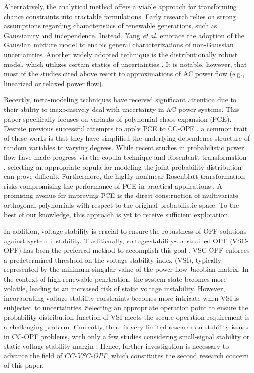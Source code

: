 \documentclass[journal]{IEEEtran}
\theoremstyle{definition}
\theoremstyle{remark}
\begin{document}
Alternatively, the analytical method offers a viable approach for transforming chance constraints into tractable formulations. Early research relies on strong assumptions regarding characteristics of renewable generations, such as Gaussianity and independence. Instead, Yang \textit{et al.} \cite{yang2020analytical} embrace the adoption of the Gaussian mixture model to enable general characterizations of non-Gaussian uncertainties. Another widely adopted technique is the distributionally robust model, which utilizes certain statics of uncertainties \cite{roald2018chance,li2019distribution,arab2022distributionally,arrigo2022embed}. It is notable, however, that most of the studies cited above resort to approximations of AC power flow (e.g., linearized or relaxed power flow).

Recently, meta-modeling techniques have received significant attention due to their ability to inexpensively deal with uncertainty in AC power systems. This paper specifically focuses on variants of polynomial chaos expansion (PCE). Despite previous successful attempts to apply PCE to CC-OPF \cite{li2018compressive,muhlpfordt2019chance,metivier2020efficient,xu2021iterative}, a common trait of these works is that they have simplified the underlying dependence structure of random variables to varying degrees.
While recent studies in probabilistic power flow have made progress via the copula technique and Rosenblatt transformation
 \cite{ye2022generalized,ly2022scalable}, selecting an appropriate copula for modeling the joint probability distribution can prove difficult. Furthermore, the highly nonlinear Rosenblatt transformation risks compromising the performance of PCE in practical applications \cite{lee2022reliability}. A promising avenue for improving PCE is the direct construction of multivariate orthogonal polynomials with respect to the original probabilistic space. To the best of our knowledge, this approach is yet to receive sufficient exploration.

 In addition, voltage stability is crucial to ensure the robustness of OPF solutions against system instability. Traditionally, voltage-stability-constrained OPF (VSC-OPF) has been the preferred method to accomplish this goal \cite{jia2023voltage,cui2018new,avalos2008practical}. VSC-OPF enforces a predetermined threshold on the voltage stability index (VSI), typically represented by the minimum singular value of the power flow Jacobian matrix. In the context of high renewable penetration, the system state becomes more volatile, leading to an increased risk of static voltage instability.
 However, incorporating voltage stability constraints becomes more intricate when VSI is subjected to uncertainties. Selecting an appropriate operation point to ensure the probability distribution function of VSI meets the secure operation requirement is a challenging problem.
 Currently, there is very limited research on stability issues in CC-OPF problems, with only a few studies considering small-signal stability \cite{wang2023stability} or static voltage stability margin \cite{yang2022optimization}. 
 Hence, further investigation is necessary to advance the field of \textit{CC-VSC-OPF}, which constitutes the second research concern of this paper. 
\end{document}
